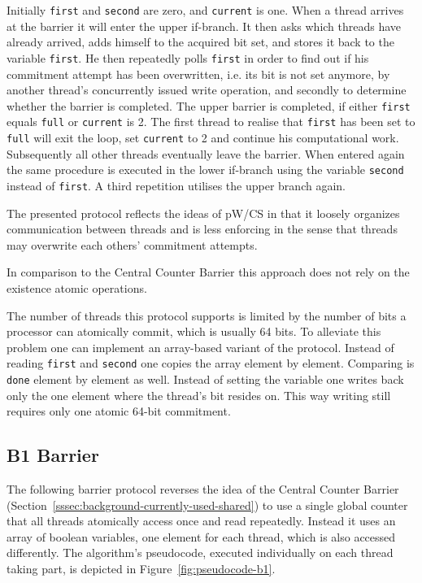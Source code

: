 \documentclass[a4paper, 10pt]{article}
\begin{document}
Initially \texttt{first} and \texttt{second} are zero, and \texttt{current} is one. When a thread arrives at the barrier it will enter the upper if-branch. It then asks which threads have already arrived, adds himself to the acquired bit set, and stores it back to the variable \texttt{first}.
He then repeatedly polls \texttt{first} in order to find out if his commitment attempt has been overwritten, i.e. its bit is not set anymore, by another thread's concurrently issued write operation, and secondly to determine whether the barrier is completed. The upper barrier is completed, if either \texttt{first} equals \texttt{full} or \texttt{current} is 2. The first thread to realise that \texttt{first} has been set to \texttt{full} will exit the loop, set \texttt{current} to 2 and continue his computational work. Subsequently all other threads eventually leave the barrier.
When entered again the same procedure is executed in the lower if-branch using the variable \texttt{second} instead of \texttt{first}. A third repetition utilises the upper branch again.

The presented protocol reflects the ideas of pW/CS in that it loosely organizes communication between threads and is less enforcing in the sense that threads may overwrite each others' commitment attempts.

In comparison to the Central Counter Barrier this approach does not rely on the existence atomic operations.

The number of threads this protocol supports is limited by the number of bits a processor can atomically commit, which is usually 64 bits. To alleviate this problem one can implement an array-based variant of the protocol. Instead of reading \texttt{first} and \texttt{second} one copies the array element by element. Comparing is \texttt{done} element by element as well. Instead of setting the variable one writes back only the one element where the thread's bit resides on. This way writing still requires only one atomic 64-bit commitment.

\subsection{B1 Barrier}
\label{ssec:new-b1}

The following barrier protocol reverses the idea of the Central Counter Barrier (Section~\ref{sssec:background-currently-used-shared}) to use a single global counter that all threads atomically access once and read repeatedly. Instead it uses an array of boolean variables, one element for each thread, which is also accessed differently.
The algorithm's pseudocode, executed individually on each thread taking part, is depicted in Figure~\ref{fig:pseudocode-b1}.
\end{document}
